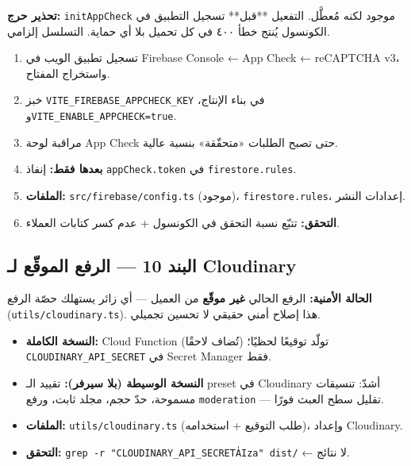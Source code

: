 \documentclass[11pt]{article}
\begin{document}
\begin{warnbox}
\textbf{تحذير حرج:} \texttt{initAppCheck} موجود لكنه مُعطَّل. التفعيل **قبل** تسجيل التطبيق في الكونسول
يُنتج خطأ ٤٠٠ في كل تحميل بلا أي حماية. التسلسل إلزامي.
\end{warnbox}

\begin{enumerate}
  \item تسجيل تطبيق الويب في Firebase Console ← App Check ← reCAPTCHA v3، واستخراج المفتاح.
  \item خبز \texttt{VITE\_FIREBASE\_APPCHECK\_KEY} في بناء الإنتاج، و\texttt{VITE\_ENABLE\_APPCHECK=true}.
  \item مراقبة لوحة App Check حتى تصبح الطلبات «متحقّقة» بنسبة عالية.
  \item \textbf{بعدها فقط:} إنفاذ \texttt{appCheck.token} في \texttt{firestore.rules}.
  \item \textbf{الملفات:} \texttt{src/firebase/config.ts} (موجود)، \texttt{firestore.rules}، إعدادات النشر.
  \item \textbf{التحقق:} تتبّع نسبة التحقق في الكونسول + عدم كسر كتابات العملاء.
\end{enumerate}

\subsection{البند 10 — الرفع الموقّع لـ Cloudinary}

\begin{warnbox}
\textbf{الحالة الأمنية:} الرفع الحالي \textbf{غير موقّع} من العميل — أي زائر يستهلك حصّة الرفع
(\texttt{utils/cloudinary.ts}). هذا إصلاح أمني حقيقي لا تحسين تجميلي.
\end{warnbox}

\begin{itemize}
  \item \textbf{النسخة الكاملة:} Cloud Function (تُضاف لاحقًا) تولّد توقيعًا لحظيًا؛
        \texttt{CLOUDINARY\_API\_SECRET} في Secret Manager فقط.
  \item \textbf{النسخة الوسيطة (بلا سيرفر):} تقييد الـ preset في Cloudinary أشدّ: تنسيقات مسموحة،
        حدّ حجم، مجلد ثابت، ورفع \texttt{moderation} — تقليل سطح العبث فورًا.
  \item \textbf{الملفات:} \texttt{utils/cloudinary.ts} (طلب التوقيع + استخدامه)، وإعداد Cloudinary.
  \item \textbf{التحقق:} \texttt{grep -r "CLOUDINARY\_API\_SECRET\|AIza" dist/} ← لا نتائج.
\end{itemize}
\end{document}
